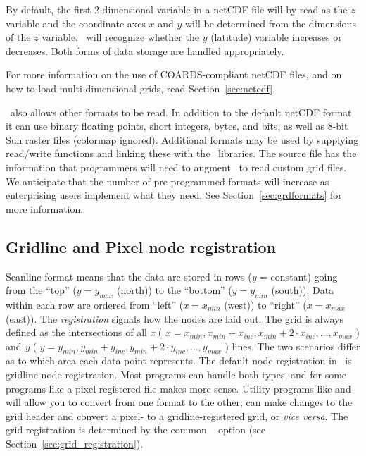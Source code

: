 By default, the first 2-dimensional variable in a netCDF file will by read as the $z$ variable
and the coordinate axes $x$ and $y$ will be determined from the dimensions of the $z$ variable.
\GMT\ will recognize whether the $y$ (latitude) variable increases or decreases. Both forms of
data storage are handled appropriately.

For more information on the use of COARDS-compliant netCDF files, and on how to load
multi-dimensional grids, read Section~\ref{sec:netcdf}.

\GMT\ also allows other formats to be read.  In addition to
the default netCDF format it can use binary floating points, short
integers, bytes, and bits, as well as 8-bit Sun raster files (colormap
ignored).   Additional formats may be used by supplying read/write
functions and linking these with the \GMT\ libraries.
The source file  has the information that
programmers will need to augment \GMT\ to read custom grid files.  We
anticipate that the number of pre-programmed formats will increase as
enterprising users implement what they need.  See Section~\ref{sec:grdformats}
for more information.


\subsection{Gridline and Pixel node registration}

Scanline format means that the data are stored in rows (\emph{y} = constant)
going from the ``top'' ($y = y_{max}$ (north)) to the ``bottom''
($y = y_{min}$ (south)).  Data within each row are ordered from
``left'' ($x = x_{min}$ (west)) to ``right'' ($x = x_{max}$
(east)).  The \emph{registration} signals how the nodes are laid out.
The grid is always defined as the intersections of all \emph{x}
( \( x = x_{min}, x_{min} + x_{inc}, x_{min} + 2 \cdot x_{inc}, \ldots, x_{max} \) )
and \emph{y} ( \( y = y_{min}, y_{min} + y_{inc}, y_{min} + 2 \cdot y_{inc}, \ldots, y_{max} \) )
lines.  The two scenarios differ as to which area each data point represents.
The default node registration in \GMT\ is gridline node registration.  Most
programs can handle both types, and for some programs like 
a pixel registered file makes more sense.  Utility programs like
 and  will allow you to convert
from one format to the other;  can make changes to the grid header
and convert a pixel- to a gridline-registered grid, or \emph{vice versa}.
The grid registration is determined by the common \GMT\  option
(see Section~\ref{sec:grid_registration}).

